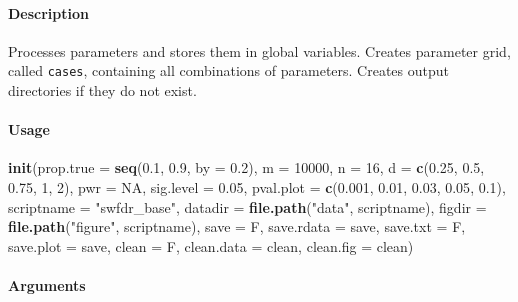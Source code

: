 \documentclass[]{article}
\newenvironment{Shaded}{\begin{snugshade}}{\end{snugshade}}
\newcommand{\KeywordTok}[1]{\textcolor[rgb]{0.13,0.29,0.53}{\textbf{{#1}}}}
\newcommand{\DataTypeTok}[1]{\textcolor[rgb]{0.13,0.29,0.53}{{#1}}}
\newcommand{\DecValTok}[1]{\textcolor[rgb]{0.00,0.00,0.81}{{#1}}}
\newcommand{\FloatTok}[1]{\textcolor[rgb]{0.00,0.00,0.81}{{#1}}}
\newcommand{\StringTok}[1]{\textcolor[rgb]{0.31,0.60,0.02}{{#1}}}
\newcommand{\OtherTok}[1]{\textcolor[rgb]{0.56,0.35,0.01}{{#1}}}
\newcommand{\NormalTok}[1]{{#1}}
\let\oldparagraph\paragraph
\renewcommand{\paragraph}[1]{\oldparagraph{#1}\mbox{}}
\begin{document}
\paragraph{Description}\label{description-1}

Processes parameters and stores them in global variables. Creates
parameter grid, called \texttt{cases}, containing all combinations of
parameters. Creates output directories if they do not exist.

\paragraph{Usage}\label{usage-1}

\begin{Shaded}
\begin{Highlighting}[]
\KeywordTok{init}\NormalTok{(}\DataTypeTok{prop.true =} \KeywordTok{seq}\NormalTok{(}\FloatTok{0.1}\NormalTok{, }\FloatTok{0.9}\NormalTok{, }\DataTypeTok{by =} \FloatTok{0.2}\NormalTok{),}
     \DataTypeTok{m =} \DecValTok{10000}\NormalTok{,}
     \DataTypeTok{n =} \DecValTok{16}\NormalTok{,}
     \DataTypeTok{d =} \KeywordTok{c}\NormalTok{(}\FloatTok{0.25}\NormalTok{, }\FloatTok{0.5}\NormalTok{, }\FloatTok{0.75}\NormalTok{, }\DecValTok{1}\NormalTok{, }\DecValTok{2}\NormalTok{),}
     \DataTypeTok{pwr =} \OtherTok{NA}\NormalTok{, }\DataTypeTok{sig.level =} \FloatTok{0.05}\NormalTok{,}
     \DataTypeTok{pval.plot =} \KeywordTok{c}\NormalTok{(}\FloatTok{0.001}\NormalTok{, }\FloatTok{0.01}\NormalTok{, }\FloatTok{0.03}\NormalTok{, }\FloatTok{0.05}\NormalTok{, }\FloatTok{0.1}\NormalTok{),}
     \DataTypeTok{scriptname =} \StringTok{"swfdr_base"}\NormalTok{,}
     \DataTypeTok{datadir =} \KeywordTok{file.path}\NormalTok{(}\StringTok{"data"}\NormalTok{, scriptname),}
     \DataTypeTok{figdir =} \KeywordTok{file.path}\NormalTok{(}\StringTok{"figure"}\NormalTok{, scriptname),}
     \DataTypeTok{save =} \NormalTok{F, }\DataTypeTok{save.rdata =} \NormalTok{save, }\DataTypeTok{save.txt =} \NormalTok{F, }\DataTypeTok{save.plot =} \NormalTok{save,}
     \DataTypeTok{clean =} \NormalTok{F, }\DataTypeTok{clean.data =} \NormalTok{clean, }\DataTypeTok{clean.fig =} \NormalTok{clean)}
\end{Highlighting}
\end{Shaded}

\paragraph{Arguments}\label{arguments-1}
\end{document}
